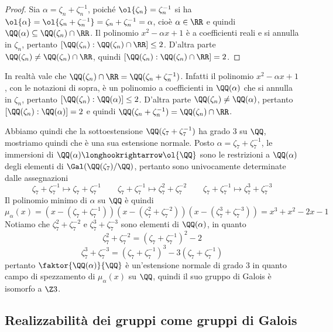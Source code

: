 \documentclass[11pt]{scrartcl}
\begin{document}
	\begin{proof}
		Sia $\alpha = \zeta_n + \zeta_n^{-1}$, poiché $\ol{\zeta_n} = \zeta_n^{-1}$
		si ha $\ol{\alpha} = \ol{\zeta_n + \zeta_n^{-1}} = \zeta_n + \zeta_n^{-1} = \alpha$,
		cioè $\alpha \in \RR$ e quindi $\QQ(\alpha) \subseteq \QQ(\zeta_n)\cap \RR$.
		Il polinomio $x^2 - \alpha x + 1$ è a coefficienti reali e si annulla in 
		$\zeta_n$, pertanto $[\QQ(\zeta_n):\QQ(\zeta_n)\cap \RR]\leq 2$. D'altra
		parte $\QQ(\zeta_n)\neq \QQ(\zeta_n)\cap \RR$, quindi 
		$[\QQ(\zeta_n):\QQ(\zeta_n)\cap \RR] = 2$.
	\end{proof}
	
	\begin{remark}
		In realtà vale che $\QQ(\zeta_n)\cap \RR = \QQ(\zeta_n + \zeta_n^{-1})$.
		Infatti il polinomio $x^2 - \alpha x + 1$, con le notazioni di sopra, 
		è un polinomio a coefficienti in $\QQ(\alpha)$ che si annulla in $\zeta_n$,
		pertanto $[\QQ(\zeta_n):\QQ(\alpha)] \leq 2$. D'altra parte $\QQ(\zeta_n)\neq \QQ(\alpha)$,
		pertanto $[\QQ(\zeta_n):\QQ(\alpha)] = 2$ e quindi 
		$\QQ(\zeta_n + \zeta_n^{-1}) = \QQ(\zeta_n)\cap \RR$.
	\end{remark}
	
	Abbiamo quindi che la sottoestensione $\QQ(\zeta_7 + \zeta_7^{-1})$ ha grado
	3 su $\QQ$, mostriamo quindi che è una sua estensione normale. Posto 
	$\alpha = \zeta_7 + \zeta_7^{-1}$, le immersioni di 
	$\QQ(\alpha) \longhookrightarrow \ol{\QQ}$ sono le restrizioni a $\QQ(\alpha)$
	degli elementi di $\Gal(\QQ(\zeta_7)/\QQ)$, pertanto sono univocamente determinate
	dalle assegnazioni 
	\[
	\zeta_7 + \zeta_7^{-1} \longmapsto \zeta_7 + \zeta_7^{-1}\qquad
	\zeta_7 + \zeta_7^{-1} \longmapsto \zeta_7^2 + \zeta_7^{-2}\qquad
	\zeta_7 + \zeta_7^{-1} \longmapsto \zeta_7^3 + \zeta_7^{-3}
	\]
	Il polinomio minimo di $\alpha$ su $\QQ$ è quindi 
	\[
	\mu_{\alpha}(x) = (x - (\zeta_7 + \zeta_7^{-1}))(x - (\zeta_7^2 + \zeta_7^{-2}))(x - (\zeta_7^3 + \zeta_7^{-3}))
	= x^3 + x^2 - 2x - 1
	\]
	Notiamo che $\zeta_7^2 + \zeta_7^{-2}$ e $\zeta_7^3 + \zeta_7^{-3}$ sono
	elementi di $\QQ(\alpha)$, in quanto
	\[
	\zeta_7^2 + \zeta_7^{-2} = (\zeta_7 + \zeta_7^{-1})^2 - 2
	\]
	\[
	\zeta_7^3 + \zeta_7^{-3} = (\zeta_7 + \zeta_7^{-1})^3 - 3(\zeta_7 + \zeta_7^{-1})
	\]
	pertanto $\faktor{\QQ(\alpha)}{\QQ}$ è un'estensione normale di grado 3 in 
	quanto campo di spezzamento di $\mu_{\alpha}(x)$ su $\QQ$,
	quindi il suo gruppo di Galois è isomorfo a $\Z3$.
	
	\newpage
	
	\subsection{Realizzabilità dei gruppi come gruppi di Galois}
	
\end{document}
